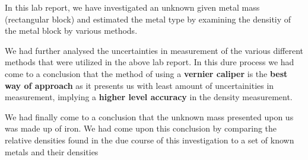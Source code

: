 {In this lab report, we have investigated an unknown given metal mass (rectangular block) and estimated the metal type by examining the densitiy of the metal block by various methods.}

{We had further analysed the uncertainties in measurement of the various different methods that were utilized in the above lab report. In this dure process we had come to a conclusion that the method of using a \textbf{vernier caliper} is the \textbf{best way of approach} as it presents us with least amount of uncertainities in measurement, implying a \textbf{higher level accuracy} in the density measurement.}

{We had finally come to a conclusion that the unknown mass presented upon us was made up of iron. We had come upon this conclusion by comparing the relative densities found in the due course of this investigation to a set of known metals and their densities}


